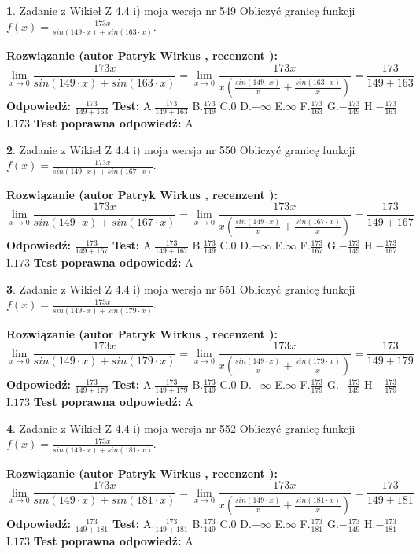 \documentclass[12pt, a4paper]{article}
\theoremstyle{definition} %
\newtheorem{zad}{}
\newcommand{\zadStart}[1]{\begin{zad}#1\newline}
\newcommand{\zadStop}{\end{zad}}
\newcommand{\rozwStart}[2]{\noindent \textbf{Rozwiązanie (autor #1 , recenzent #2): }\newline}
\newcommand{\rozwStop}{\newline}
\newcommand{\odpStart}{\noindent \textbf{Odpowiedź:}\newline}
\newcommand{\odpStop}{\newline}
\newcommand{\testStart}{\noindent \textbf{Test:}\newline}
\newcommand{\testStop}{\newline}
\newcommand{\kluczStart}{\noindent \textbf{Test poprawna odpowiedź:}\newline}
\newcommand{\kluczStop}{\newline}
\begin{document}
\zadStart{Zadanie z Wikieł Z 4.4 i) moja wersja nr 549}
Obliczyć granicę funkcji $f(x)=\frac{173x}{sin(149\cdot x) +sin(163\cdot x)}$.
\zadStop
\rozwStart{Patryk Wirkus}{}
$$\lim\limits_{x\to 0}\frac{173x}{sin(149\cdot x) +sin(163\cdot x)}=\lim\limits_{x\to 0}\frac{173x}{x(\frac{sin(149\cdot x)}{x}+\frac{sin(163\cdot x)}{x})}=\frac{173}{149+163}$$
\rozwStop
\odpStart
$\frac{173}{149+163}$
\odpStop
\testStart
A.$\frac{173}{149+163}$
B.$\frac{173}{149}$
C.$0$
D.$-\infty$
E.$\infty$
F.$\frac{173}{163}$
G.$-\frac{173}{149}$
H.$-\frac{173}{163}$
I.$173$
\testStop
\kluczStart
A
\kluczStop



\zadStart{Zadanie z Wikieł Z 4.4 i) moja wersja nr 550}
Obliczyć granicę funkcji $f(x)=\frac{173x}{sin(149\cdot x) +sin(167\cdot x)}$.
\zadStop
\rozwStart{Patryk Wirkus}{}
$$\lim\limits_{x\to 0}\frac{173x}{sin(149\cdot x) +sin(167\cdot x)}=\lim\limits_{x\to 0}\frac{173x}{x(\frac{sin(149\cdot x)}{x}+\frac{sin(167\cdot x)}{x})}=\frac{173}{149+167}$$
\rozwStop
\odpStart
$\frac{173}{149+167}$
\odpStop
\testStart
A.$\frac{173}{149+167}$
B.$\frac{173}{149}$
C.$0$
D.$-\infty$
E.$\infty$
F.$\frac{173}{167}$
G.$-\frac{173}{149}$
H.$-\frac{173}{167}$
I.$173$
\testStop
\kluczStart
A
\kluczStop



\zadStart{Zadanie z Wikieł Z 4.4 i) moja wersja nr 551}
Obliczyć granicę funkcji $f(x)=\frac{173x}{sin(149\cdot x) +sin(179\cdot x)}$.
\zadStop
\rozwStart{Patryk Wirkus}{}
$$\lim\limits_{x\to 0}\frac{173x}{sin(149\cdot x) +sin(179\cdot x)}=\lim\limits_{x\to 0}\frac{173x}{x(\frac{sin(149\cdot x)}{x}+\frac{sin(179\cdot x)}{x})}=\frac{173}{149+179}$$
\rozwStop
\odpStart
$\frac{173}{149+179}$
\odpStop
\testStart
A.$\frac{173}{149+179}$
B.$\frac{173}{149}$
C.$0$
D.$-\infty$
E.$\infty$
F.$\frac{173}{179}$
G.$-\frac{173}{149}$
H.$-\frac{173}{179}$
I.$173$
\testStop
\kluczStart
A
\kluczStop



\zadStart{Zadanie z Wikieł Z 4.4 i) moja wersja nr 552}
Obliczyć granicę funkcji $f(x)=\frac{173x}{sin(149\cdot x) +sin(181\cdot x)}$.
\zadStop
\rozwStart{Patryk Wirkus}{}
$$\lim\limits_{x\to 0}\frac{173x}{sin(149\cdot x) +sin(181\cdot x)}=\lim\limits_{x\to 0}\frac{173x}{x(\frac{sin(149\cdot x)}{x}+\frac{sin(181\cdot x)}{x})}=\frac{173}{149+181}$$
\rozwStop
\odpStart
$\frac{173}{149+181}$
\odpStop
\testStart
A.$\frac{173}{149+181}$
B.$\frac{173}{149}$
C.$0$
D.$-\infty$
E.$\infty$
F.$\frac{173}{181}$
G.$-\frac{173}{149}$
H.$-\frac{173}{181}$
I.$173$
\testStop
\kluczStart
A
\kluczStop
\end{document}

